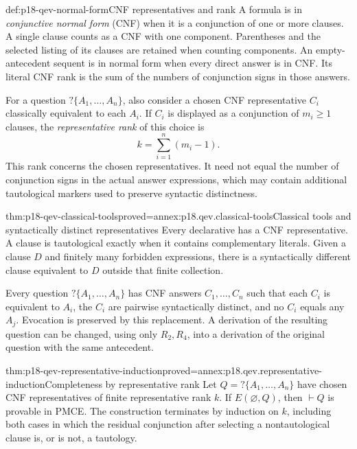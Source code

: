 \begin{hbdefinition}{def:p18-qev-normal-form}{CNF representatives and rank}
A formula is in \emph{conjunctive normal form} (CNF) when it is a
conjunction of one or more clauses. A single clause counts as a CNF
with one component. Parentheses and the selected listing of its clauses
are retained when counting components. An empty-antecedent sequent is
in normal form when every direct answer is in CNF. Its literal CNF
rank is the sum of the numbers of conjunction signs in those answers.

For a question \(?\{A_1,\ldots,A_n\}\), also consider a chosen
CNF representative \(C_i\) classically equivalent to each \(A_i\).
If \(C_i\) is displayed as a conjunction of \(m_i\geq1\) clauses,
the \emph{representative rank} of this choice is
\[
 k=\sum_{i=1}^n(m_i-1).
\]
This rank concerns the chosen representatives. It need not equal the
number of conjunction signs in the actual answer expressions, which
may contain additional tautological markers used to preserve syntactic
distinctness.
\end{hbdefinition}

\begin{hblemma}{thm:p18-qev-classical-tools}{proved=annex:p18.qev.classical-tools}{Classical tools and syntactically distinct representatives}
Every declarative has a CNF representative. A clause is tautological
exactly when it contains complementary literals. Given a clause \(D\)
and finitely many forbidden expressions, there is a syntactically
different clause equivalent to \(D\) outside that finite collection.

Every question \(?\{A_1,\ldots,A_n\}\) has CNF answers
\(C_1,\ldots,C_n\) such that each \(C_i\) is equivalent to
\(A_i\), the \(C_i\) are pairwise syntactically distinct, and no
\(C_i\) equals any \(A_j\). Evocation is preserved by this
replacement. A derivation of the resulting question can be changed,
using only \(R_2,R_4\), into a derivation of the original question
with the same antecedent.
\end{hblemma}

\begin{hblemma}{thm:p18-qev-representative-induction}{proved=annex:p18.qev.representative-induction}{Completeness by representative rank}
Let \(Q=?\{A_1,\ldots,A_n\}\) have chosen CNF representatives
of finite representative rank \(k\). If \(E(\varnothing,Q)\),
then \(\vdash Q\) is provable in PMCE. The construction terminates
by induction on \(k\), including both cases in which the residual
conjunction after selecting a nontautological clause is, or is not,
a tautology.
\end{hblemma}

